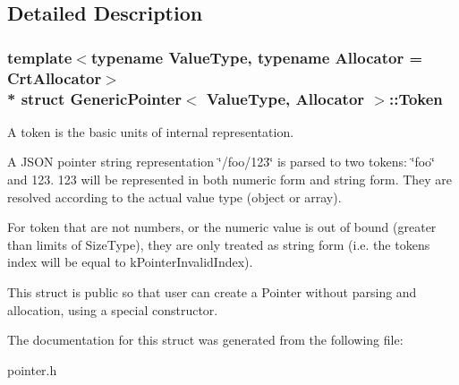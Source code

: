 \subsection{Detailed Description}
\subsubsection*{template$<$typename Value\+Type, typename Allocator = Crt\+Allocator$>$\\*
struct Generic\+Pointer$<$ Value\+Type, Allocator $>$\+::\+Token}

A token is the basic units of internal representation. 

A J\+S\+ON pointer string representation \char`\"{}/foo/123\char`\"{} is parsed to two tokens\+: \char`\"{}foo\char`\"{} and 123. 123 will be represented in both numeric form and string form. They are resolved according to the actual value type (object or array).

For token that are not numbers, or the numeric value is out of bound (greater than limits of Size\+Type), they are only treated as string form (i.\+e. the token\textquotesingle{}s index will be equal to k\+Pointer\+Invalid\+Index).

This struct is public so that user can create a Pointer without parsing and allocation, using a special constructor. 

The documentation for this struct was generated from the following file\+:\begin{DoxyCompactItemize}
\item 
pointer.\+h\end{DoxyCompactItemize}
